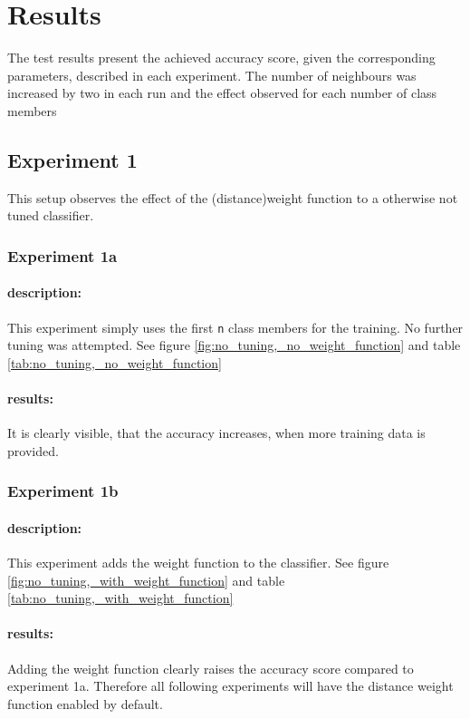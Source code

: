 \documentclass[10pt,a4paper]{proc}
\begin{document}
\section{Results}
The test results present the achieved accuracy score, given the corresponding parameters, described in each experiment. The number of neighbours was increased by two in each run and the effect observed for each number of class members
\subsection{Experiment 1}\label{exp1}
This setup observes the effect of the (distance)weight function to a otherwise not tuned classifier.
\subsubsection{Experiment 1a}
\paragraph{description:}
This experiment simply uses the first \texttt{n} class members for the training. No further tuning was attempted. See figure \ref{fig:no_tuning,_no_weight_function} and table \ref{tab:no_tuning,_no_weight_function}
\paragraph{results:} It is clearly visible, that the accuracy increases, when more training data is provided.

\FloatBarrier
\subsubsection{Experiment 1b}\label{exp1}
\paragraph{description:}
This experiment adds the weight function to the classifier. See figure \ref{fig:no_tuning,_with_weight_function} and table \ref{tab:no_tuning,_with_weight_function}
\paragraph{results:} Adding the weight function clearly raises the accuracy score compared to experiment 1a. Therefore all following experiments will have the distance weight function enabled by default.

\FloatBarrier
\end{document}
